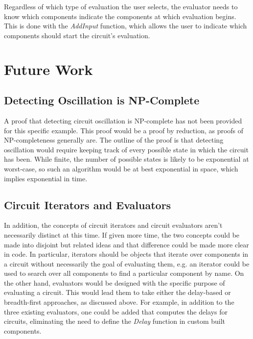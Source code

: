 \documentclass{article}
\newcommand{\FunctionName}[1]{\textit{#1}}
\begin{document}
Regardless of which type of evaluation the user selects, the evaluator needs to know which components indicate the components at which evaluation begins. This is done with the \FunctionName{AddInput} function, which allows the user to indicate which components should start the circuit’s evaluation.

\section{Future Work}

\subsection{Detecting Oscillation is NP-Complete}
A proof that detecting circuit oscillation is NP-complete has not been provided for this specific example. This proof would be a proof by reduction, as proofs of NP-completeness generally are. The outline of the proof is that detecting oscillation would require keeping track of every possible state in which the circuit has been. While finite, the number of possible states is likely to be exponential at worst-case, so such an algorithm would be at best exponential in space, which implies exponential in time.

\subsection{Circuit Iterators and Evaluators}
In addition, the concepts of circuit iterators and circuit evaluators aren't necessarily distinct at this time. If given more time, the two concepts could be made into disjoint but related ideas and that difference could be made more clear in code. In particular, iterators should be objects that iterate over components in a circuit without necessarily the goal of evaluating them, e.g. an iterator could be used to search over all components to find a particular component by name. On the other hand, evaluators would be designed with the specific purpose of evaluating a circuit. This would lead them to take either the delay-based or breadth-first approaches, as discussed above. For example, in addition to the three existing evaluators, one could be added that computes the delays for circuits, eliminating the need to define the \FunctionName{Delay} function in custom built components.
\end{document}

